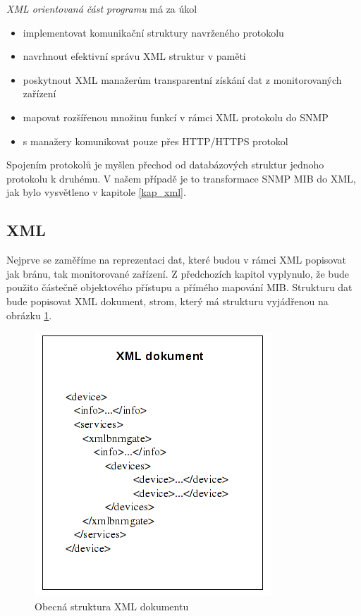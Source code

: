 \textit{XML orientovaná část programu } má za úkol
\begin{itemize}
	\item implementovat komunikační struktury navrženého protokolu
	\item navrhnout efektivní správu XML struktur v paměti
	\item poskytnout XML manažerům transparentní získání dat z monitorovaných zařízení
	\item mapovat rozšířenou množinu funkcí v rámci XML protokolu do SNMP
	\item s manažery komunikovat pouze přes HTTP/HTTPS protokol
\end{itemize}
Spojením protokolů je myšlen přechod od databázových struktur jednoho protokolu k druhému. V našem případě je to transformace SNMP MIB do XML, jak bylo vysvětleno v kapitole \ref{kap_xml}.

\subsection{XML}
Nejprve se zaměříme na reprezentaci dat, které budou v rámci XML popisovat jak bránu, tak monitorované zařízení. Z předchozích kapitol vyplynulo, že bude použito částečně objektového přístupu a přímého mapování MIB.
Strukturu dat bude popisovat XML dokument, strom, který má strukturu vyjádřenou na obrázku \ref{obr_an_strom_struktura}.

\begin{figure}[htp]
	\begin{center}
		\includegraphics{obrazky/04_schema_dokumentu.png}
		\caption{Obecná struktura XML dokumentu}
		\label{obr_an_strom_struktura}
	\end{center}
\end{figure}

